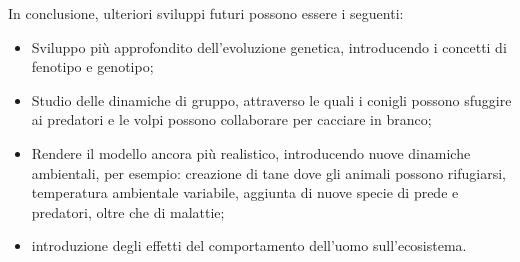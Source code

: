 \documentclass[11pt]{article}
\begin{document}
In conclusione, ulteriori sviluppi futuri possono essere i seguenti: 
\begin{itemize}
    \item Sviluppo più approfondito dell'evoluzione genetica, introducendo i concetti di fenotipo e genotipo;
    \item Studio delle dinamiche di gruppo, attraverso le quali i conigli possono sfuggire ai predatori e le volpi possono collaborare per cacciare in branco;
    \item Rendere il modello ancora più realistico, introducendo nuove dinamiche ambientali, per esempio: creazione di tane dove gli animali possono rifugiarsi, temperatura ambientale variabile, aggiunta di nuove specie di prede e predatori, oltre che di malattie;
    \item introduzione degli effetti del comportamento dell'uomo sull'ecosistema.
\end{itemize}




\newpage
\printbibliography	
\end{document}
